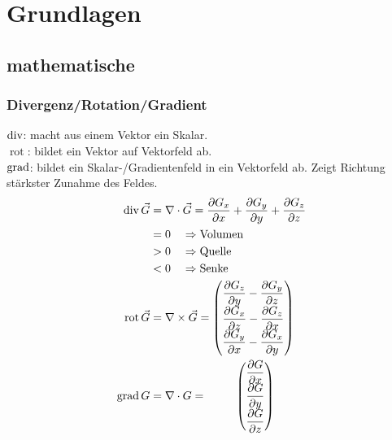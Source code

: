 \section{Grundlagen}
\subsection{mathematische}
\subsubsection*{Divergenz/Rotation/Gradient}

$\operatorname{div}$: macht aus einem Vektor ein Skalar.\\
$\operatorname{rot}$: bildet ein Vektor auf Vektorfeld ab.\\
$\operatorname{grad}$: bildet ein Skalar-/Gradientenfeld in ein Vektorfeld ab.
Zeigt Richtung stärkster Zunahme des Feldes.
\begin{align*}
    \operatorname{div} \vec{G}             & = \nabla \cdot \vec{G} = \dfrac{\partial G_x}{\partial x} + \dfrac{\partial G_y}{\partial y} + \dfrac{\partial G_z}{\partial z} \\
                               & = 0 \quad\Rightarrow \textnormal{Volumen}                                                                                       \\
                               & > 0 \quad\Rightarrow \textnormal{Quelle}                                                                                        \\
                               & < 0 \quad\Rightarrow \textnormal{Senke}                                                                                         \\
    \operatorname{rot} \vec{G} & = \nabla \times \vec{G} =
    \begin{pmatrix}
        \dfrac{\partial G_z}{\partial y} - \dfrac{\partial G_y}{\partial z} \\
        \dfrac{\partial G_x}{\partial z} - \dfrac{\partial G_z}{\partial x} \\
        \dfrac{\partial G_y}{\partial x} - \dfrac{\partial G_x}{\partial y}
    \end{pmatrix}                                                                                          \\
    \operatorname{grad} G                  & = \nabla \cdot G = \hspace{6ex}
    \begin{pmatrix}
        \dfrac{\partial G}{\partial x} \\
        \dfrac{\partial G}{\partial y} \\
        \dfrac{\partial G}{\partial z}
    \end{pmatrix}
\end{align*}


